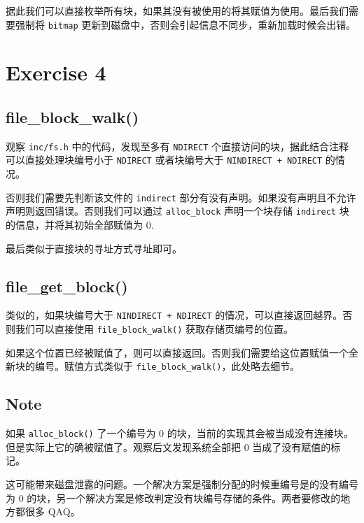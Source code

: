 \documentclass[11pt]{article}
\begin{document}
	\par 据此我们可以直接枚举所有块，如果其没有被使用的将其赋值为使用。最后我们需要强制将 \texttt{bitmap} 更新到磁盘中，否则会引起信息不同步，重新加载时候会出错。
	
	\section{Exercise 4}
	
	\subsection*{file\_block\_walk()}
	
	\par 观察 \texttt{inc/fs.h} 中的代码，发现至多有 \texttt{NDIRECT} 个直接访问的块，据此结合注释可以直接处理块编号小于 \texttt{NDIRECT} 或者块编号大于 \texttt{NINDIRECT + NDIRECT} 的情况。
	
	\par 否则我们需要先判断该文件的 \texttt{indirect} 部分有没有声明。如果没有声明且不允许声明则返回错误。否则我们可以通过 \texttt{alloc\_block} 声明一个块存储 \texttt{indirect} 块的信息，并将其初始全部赋值为 $0$.
	
	\par 最后类似于直接块的寻址方式寻址即可。
	
	\subsection*{file\_get\_block()}
	
	\par 类似的，如果块编号大于 \texttt{NINDIRECT + NDIRECT} 的情况，可以直接返回越界。否则我们可以直接使用 \texttt{file\_block\_walk()} 获取存储页编号的位置。
	
	\par 如果这个位置已经被赋值了，则可以直接返回。否则我们需要给这位置赋值一个全新块的编号。赋值方式类似于 \texttt{file\_block\_walk()}，此处略去细节。
	
	\subsection*{Note}
	
	\par 如果 \texttt{alloc\_block()} 了一个编号为 0 的块，当前的实现其会被当成没有连接块。但是实际上它的确被赋值了。观察后文发现系统全部把 0 当成了没有赋值的标记。
	
	\par 这可能带来磁盘泄露的问题。一个解决方案是强制分配的时候重编号是的没有编号为 0 的块，另一个解决方案是修改判定没有块编号存储的条件。两者要修改的地方都很多 QAQ。
	
\end{document}

